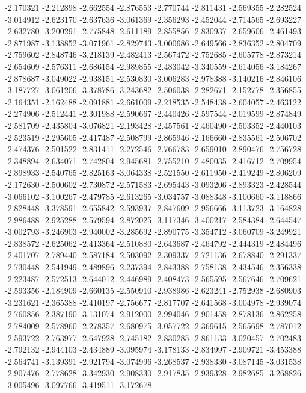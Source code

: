 -2.170321
-2.212898
-2.662554
-2.876553
-2.770744
-2.811431
-2.569355
-2.282524
-3.014912
-2.623170
-2.637636
-3.061369
-2.356293
-2.452044
-2.714565
-2.693227
-2.632780
-3.200291
-2.775848
-2.611189
-2.855856
-2.830937
-2.659606
-2.461493
-2.871987
-3.138852
-3.071961
-2.829743
-3.000686
-2.649566
-2.836352
-2.804709
-2.759602
-2.848746
-3.218139
-2.482413
-2.567472
-2.752685
-2.605778
-2.873214
-2.654609
-2.576311
-2.686154
-2.989855
-2.483042
-3.340559
-2.614056
-3.184267
-2.878687
-3.049022
-2.938151
-2.530830
-3.006283
-2.978388
-3.140216
-2.846106
-3.187727
-3.061206
-3.378786
-3.243682
-2.506038
-2.282671
-2.152778
-2.356855
-2.164351
-2.162488
-2.091881
-2.661009
-2.218535
-2.548438
-2.604057
-2.463122
-2.274906
-2.512441
-2.301988
-2.590667
-2.440426
-2.597544
-2.019599
-2.874849
-2.581709
-2.435804
-3.076821
-2.193428
-2.457561
-2.460490
-2.503352
-2.440103
-2.523519
-2.295605
-2.417487
-2.508799
-2.865946
-2.166660
-2.835561
-2.506702
-2.474376
-2.501522
-2.831411
-2.272546
-2.766783
-2.659010
-2.890476
-2.756728
-2.348894
-2.634071
-2.742804
-2.945681
-2.755210
-2.480035
-2.416712
-2.709954
-2.898933
-2.540765
-2.825163
-3.064338
-2.521550
-2.611950
-2.419249
-2.806209
-2.172630
-2.500602
-2.730872
-2.571583
-2.695443
-3.093206
-2.893323
-2.428544
-3.066102
-3.100267
-2.479785
-2.613265
-3.034757
-3.088348
-3.100660
-3.118866
-2.828448
-3.378591
-2.655842
-2.593937
-2.847609
-2.956666
-3.113723
-3.164828
-2.986488
-2.925288
-2.579594
-2.872025
-3.117346
-3.400217
-2.584384
-2.644547
-3.002793
-3.246903
-2.940002
-3.285692
-2.890775
-3.354712
-3.060709
-3.249921
-2.838572
-2.625062
-2.413364
-2.510880
-2.643687
-2.464792
-2.444319
-2.484496
-2.401707
-2.789440
-2.587184
-2.503092
-2.309337
-2.721136
-2.678840
-2.291337
-2.730448
-2.541949
-2.489896
-2.237394
-2.843388
-2.758138
-2.434546
-2.356338
-2.223487
-2.572513
-2.644012
-2.446989
-2.408473
-2.565595
-2.567646
-2.709621
-2.593356
-2.184909
-2.660135
-2.550910
-2.938986
-2.623241
-2.752938
-2.680903
-3.231621
-2.365388
-2.410197
-2.756677
-2.817707
-2.641568
-3.004978
-2.939074
-2.760856
-2.387190
-3.131074
-2.912000
-2.994046
-2.901458
-2.878136
-2.862258
-2.784009
-2.578960
-2.278357
-2.680975
-3.057722
-2.369615
-2.565698
-2.787012
-2.593722
-2.763977
-2.647928
-2.745182
-2.830285
-2.861133
-3.020457
-2.702483
-2.792132
-2.944103
-2.434889
-3.095974
-3.178133
-2.834997
-2.909721
-3.453388
-2.564741
-3.139391
-2.921794
-3.074996
-3.268537
-2.938330
-3.087145
-3.031538
-2.907476
-2.778628
-3.342930
-2.908330
-2.917835
-2.939328
-2.982685
-3.268826
-3.005496
-3.097766
-3.419511
-3.172678
